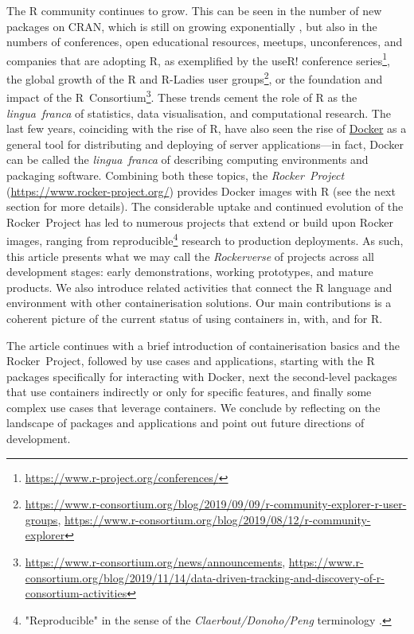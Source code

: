 The R community continues to grow. This can be seen in the number of new
packages on CRAN, which is still on growing exponentially
\citep{cran:2019}, but also in the numbers of conferences, open
educational resources, meetups, unconferences, and companies that are
adopting R, as exemplified by the useR! conference
series\footnote{\href{https://www.r-project.org/conferences/}{https://www.r-project.org/conferences/}},
the global growth of the R and R-Ladies user
groups\footnote{\href{https://www.r-consortium.org/blog/2019/09/09/r-community-explorer-r-user-groups}{https://www.r-consortium.org/blog/2019/09/09/r-community-explorer-r-user-groups}, \href{https://www.r-consortium.org/blog/2019/08/12/r-community-explorer}{https://www.r-consortium.org/blog/2019/08/12/r-community-explorer}},
or the foundation and impact of the
R~Consortium\footnote{\href{https://www.r-consortium.org/news/announcements}{https://www.r-consortium.org/news/announcements}, \href{https://www.r-consortium.org/blog/2019/11/14/data-driven-tracking-and-discovery-of-r-consortium-activities}{https://www.r-consortium.org/blog/2019/11/14/data-driven-tracking-and-discovery-of-r-consortium-activities}}.
These trends cement the role of R as the \emph{lingua~franca} of
statistics, data visualisation, and computational research. The last few
years, coinciding with the rise of R, have also seen the rise of
\href{https://en.wikipedia.org/wiki/Docker_(software)}{Docker} as a
general tool for distributing and deploying of server applications---in
fact, Docker can be called the \emph{lingua~franca} of describing
computing environments and packaging software. Combining both these
topics, the \emph{Rocker~Project}
(\url{https://www.rocker-project.org/}) provides Docker images with R
(see the next section for more details). The considerable uptake and
continued evolution of the Rocker~Project has led to numerous projects
that extend or build upon Rocker images, ranging from
reproducible\footnote{"Reproducible" in the sense of the \emph{Claerbout/Donoho/Peng} terminology \citep{barba_terminologies_2018}.}
research to production deployments. As such, this article presents what
we may call the \emph{Rockerverse} of projects across all development
stages: early demonstrations, working prototypes, and mature products.
We also introduce related activities that connect the R language and
environment with other containerisation solutions. Our main
contributions is a coherent picture of the current status of using
containers in, with, and for R.

The article continues with a brief introduction of containerisation
basics and the Rocker~Project, followed by use cases and applications,
starting with the R packages specifically for interacting with Docker,
next the second-level packages that use containers indirectly or only
for specific features, and finally some complex use cases that leverage
containers. We conclude by reflecting on the landscape of packages and
applications and point out future directions of development.

